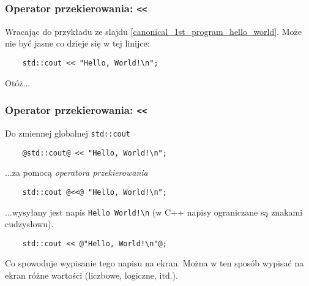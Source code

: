 \documentclass[aspectratio=169]{beamer}
\begin{document}

\begin{frame}[fragile]
    \frametitle{Operator przekierowania: {\tt <}{\tt <}}

    Wracając do przykładu ze slajdu \ref{canonical_1st_program_hello_world}.
    Może nie być jasne co dzieje się w tej linijce:

    \vspace{1em}

    \begin{lstlisting}
    std::cout << "Hello, World!\n";
    \end{lstlisting}

    \vspace{1em}

    Otóż...
\end{frame}

\begin{frame}[fragile]
    \frametitle{Operator przekierowania: {\tt <}{\tt <}}

    Do zmiennej globalnej {\tt std::cout}
    {\scriptsize
    \begin{lstlisting}
    @std::cout@ << "Hello, World!\n";
    \end{lstlisting}}

    \vspace{1em}

    ...za pomocą \emph{operatora przekierowania}
    {\scriptsize
    \begin{lstlisting}
    std::cout @<<@ "Hello, World!\n";
    \end{lstlisting}}

    \vspace{1em}

    ...wysyłany jest napis {\tt Hello World!\textbackslash n} (w C++ napisy ograniczane są
    znakami cudzysłowu).
    {\scriptsize
    \begin{lstlisting}
    std::cout << @"Hello, World!\n"@;
    \end{lstlisting}}

    \vspace{1em}

    Co spowoduje wypisanie tego napisu na ekran. Można w ten sposób wypisać na
    ekran różne wartości (liczbowe, logiczne, itd.).
\end{frame}
\end{document}
